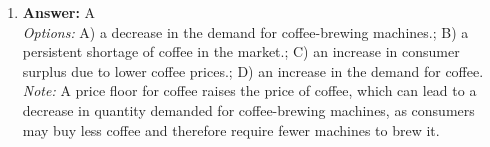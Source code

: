 \documentclass[12pt]{article}
\begin{document}
\begin{enumerate}[label=\arabic*.]
\\ \textit{Note:} Patents and copyrights provide exclusive rights to produce or sell a product, which is a characteristic of monopolies that restricts competition, while monopolistic competition involves many firms with differentiated products that do not have such exclusive protections.
\item \textbf{Answer:} A
\\ \textit{Options:} A) a decrease in the demand for coffee-brewing machines.; B) a persistent shortage of coffee in the market.; C) an increase in consumer surplus due to lower coffee prices.; D) an increase in the demand for coffee.
\\ \textit{Note:} A price floor for coffee raises the price of coffee, which can lead to a decrease in quantity demanded for coffee-brewing machines, as consumers may buy less coffee and therefore require fewer machines to brew it.
\end{enumerate}
\end{document}
